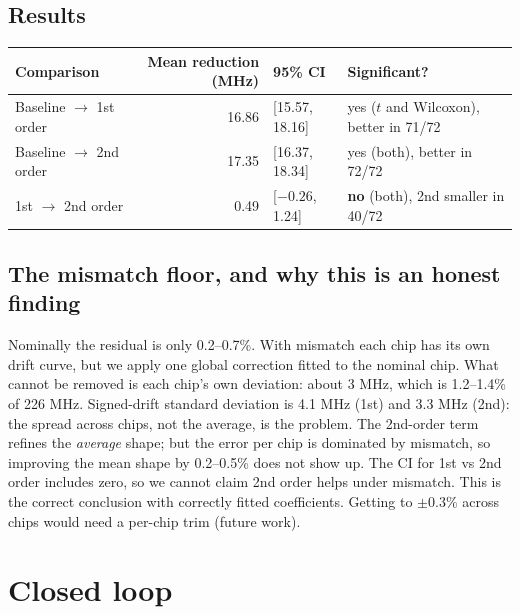 \documentclass[11pt,a4paper]{article}
\begin{document}
\subsection{Results}
\begin{center}\small\begin{tabular}{lrll}\toprule
Comparison & Mean reduction (MHz) & 95\% CI & Significant?\\\midrule
Baseline $\to$ 1st order & 16.86 & [15.57, 18.16] & yes ($t$ and Wilcoxon), better in 71/72\\
Baseline $\to$ 2nd order & 17.35 & [16.37, 18.34] & yes (both), better in 72/72\\
1st $\to$ 2nd order & 0.49 & [$-0.26$, 1.24] & \textbf{no} (both), 2nd smaller in 40/72\\\bottomrule
\end{tabular}\end{center}
\subsection{The mismatch floor, and why this is an honest finding}
Nominally the residual is only 0.2--0.7\%. With mismatch each chip has its own drift curve, but we apply one global correction fitted to the nominal chip. What cannot be removed is each chip's own deviation: about 3 MHz, which is 1.2--1.4\% of 226 MHz. Signed-drift standard deviation is 4.1 MHz (1st) and 3.3 MHz (2nd): the spread across chips, not the average, is the problem. The 2nd-order term refines the \emph{average} shape; but the error per chip is dominated by mismatch, so improving the mean shape by 0.2--0.5\% does not show up. The CI for 1st vs 2nd order includes zero, so we cannot claim 2nd order helps under mismatch. This is the correct conclusion with correctly fitted coefficients. Getting to $\pm0.3\%$ across chips would need a per-chip trim (future work).

\section{Closed loop}\label{sec:loop}
\end{document}
